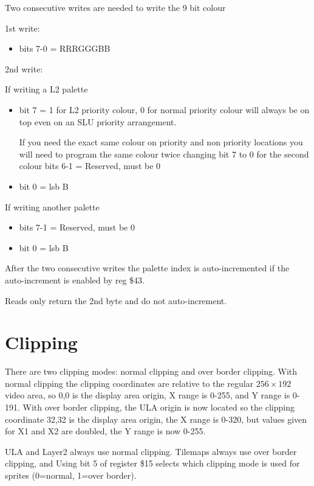 Two consecutive writes are needed to write the 9 bit colour

1st write:

\begin{itemize}
\item bits 7-0 = RRRGGGBB
\end{itemize}

2nd write: 

If writing a L2 palette

\hrulefill
\begin{itemize}
\item bit 7 = 1 for L2 priority colour, 0 for normal priority colour will always be on top even on an SLU priority arrangement. 

If you need the exact same colour on priority and non priority
locations you will need to program the same colour twice changing bit
7 to 0 for the second colour bits 6-1 = Reserved, must be 0

\item bit 0 = lsb B
\end{itemize}
     
If writing another palette

\hrulefill
\begin{itemize}
\item bits 7-1 = Reserved, must be 0
\item bit 0 = lsb B
\end{itemize}           
After the two consecutive writes the palette index is auto-incremented
if the auto-increment is enabled by reg \$43.
     
Reads only return the 2nd byte and do not auto-increment.


\section{Clipping}

There are two clipping modes: normal clipping and over border
clipping. With normal clipping the clipping coordinates are relative
to the regular $256\times192$ video area, so 0,0 is the display area origin,
X range is 0-255, and Y range is 0-191. With over border clipping, the
ULA origin is now located so the clipping coordinate 32,32 is the
display area origin, the X range is 0-320, but values given for X1 and
X2 are doubled, the Y range is now 0-255.

ULA and Layer2 always use normal clipping.  Tilemaps always use over
border clipping, and Using bit 5 of register \$15 selects which
clipping mode is used for sprites (0=normal, 1=over border).

